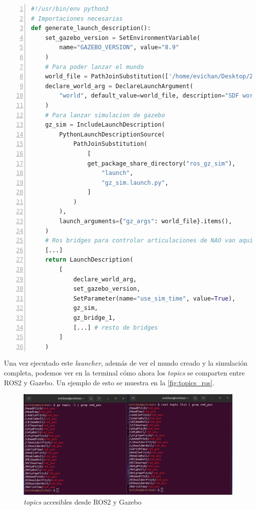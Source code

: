 \begin{lstlisting}[language=Python, caption={Launcher para simulación sin sensores}, label={lst:launcher}, numbers=left, backgroundcolor=\color{gray!10}]    
#!/usr/bin/env python3
# Importaciones necesarias
def generate_launch_description():
    set_gazebo_version = SetEnvironmentVariable(
        name="GAZEBO_VERSION", value="8.9"
    )
    # Para poder lanzar el mundo
    world_file = PathJoinSubstitution(['/home/evichan/Desktop/2024-tfg-eva-fernandez/GreenNao/greennao/worlds/greenhouse_world', 'greenhouse_world.sdf'])
    declare_world_arg = DeclareLaunchArgument(
        "world", default_value=world_file, description="SDF world file"
    )
    # Para lanzar simulacion de gazebo
    gz_sim = IncludeLaunchDescription(
        PythonLaunchDescriptionSource(
            PathJoinSubstitution(
                [
                get_package_share_directory("ros_gz_sim"),
                    "launch",
                    "gz_sim.launch.py",
                ]
            )
        ),
        launch_arguments={"gz_args": world_file}.items(),
    )
    # Ros bridges para controlar articulaciones de NAO van aqui, uno por grado de libertad
    [...]
    return LaunchDescription(
        [
            declare_world_arg,
            set_gazebo_version,
            SetParameter(name="use_sim_time", value=True),
            gz_sim,
            gz_bridge_1,
            [...] # resto de bridges
        ]
    )
\end{lstlisting}

Una vez ejecutado este \textit{launcher}, además de ver el mundo creado y la simulación completa, podemos ver en la terminal cómo ahora los \textit{topics} se comparten entre ROS2 y Gazebo. Un ejemplo de esto se muestra en la \autoref{fig:topics_ros}.

\begin{figure}[H]
  \centering
  \includegraphics[width=1\textwidth]{figures/cap_4/topics_ros.png}
  \caption{\textit{topics} accesibles desde ROS2 y Gazebo}
  \label{fig:topics_ros}
\end{figure}

